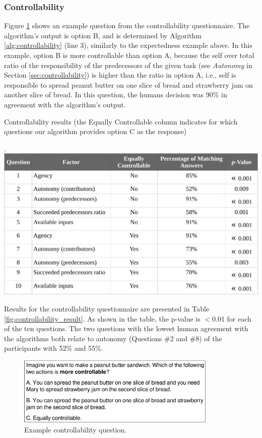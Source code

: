 \documentclass[12pt]{report}
\begin{document}
\subsubsection{Controllability}
\label{sec:controllability-crowdsourcing}
Figure \ref{fig:qs2} shows an example question from the controllability
questionnaire. The algorithm's output is option B, and is determined by
Algorithm \ref{alg:controllability} (line 3), similarly to the expectedness
example above. In this example, option B is more controllable than option A,
because the self over total ratio of the responsibility of the predecessors of
the given task (see \textit{Autonomy} in Section \ref{sec:controllability}) is
higher than the ratio in option A, i.e., self is responsible to spread peanut
butter on one slice of bread and strawberry jam on another slice of bread. In
this question, the humans decision was 90\% in agreement with the algorithm's
output.

\begin{table}[t]
  \centering
  \caption{Controllability results (the Equally Controllable column
  indicates for which questions our algorithm provides option C as the response)}.
  \label{fig:controllability_result}
  \vspace*{-3mm}
  \includegraphics[width=1\textwidth]{figure/controllability_result_croped.pdf}
\end{table}

Results for the controllability questionnaire are presented in Table
\ref{fig:controllability_result}. As shown in the table, the p-value is $<$0.01
for each of the ten questions. The two questions with the lowest human agreement
with the algorithms both relate to autonomy (Questions \#2 and \#8) of the
participants with 52\% and 55\%.

\begin{figure}[tbh]
  \centering
  \includegraphics[width=0.85\textwidth]{figure/question-sample2-croped.pdf}
  \caption{{Example controllability question.}}
  \label{fig:qs2}
\end{figure}
\end{document}

